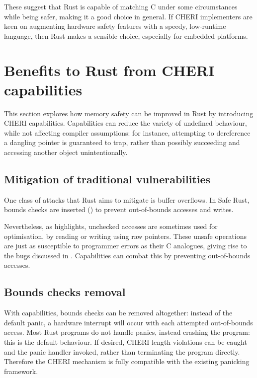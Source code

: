 \documentclass[dissertation.tex]{subfiles}
\begin{document}
These suggest that Rust is capable of matching C under some
circumstances while being safer, making it a good choice in general.
If CHERI implementers are keen on augmenting hardware safety features
with a speedy, low-runtime language, then Rust makes a sensible choice,
especially for embedded platforms.


\section{Benefits to Rust from CHERI capabilities}
\label{sec:eval-rust}

This section explores how memory safety can be improved in Rust by
introducing CHERI capabilities.
Capabilities can reduce the variety of undefined behaviour, while not
affecting compiler assumptions: for instance, attempting to dereference
a dangling pointer is guaranteed to trap, rather than possibly
succeeding and accessing another object unintentionally.

\subsection{Mitigation of traditional vulnerabilities}
\label{sec:eval-rust-vulns}

One class of attacks that Rust aims to mitigate is buffer overflows.
In Safe Rust, bounds checks are inserted ()
to prevent out-of-bounds accesses and writes.

Nevertheless, as  highlights, unchecked accesses
are sometimes used for optimisation, by reading or writing using raw
pointers.
These unsafe operations are just as susceptible to programmer errors as
their C analogues, giving rise to the bugs discussed in
.
Capabilities can combat this by preventing out-of-bounds accesses.


\subsection{Bounds checks removal}
\label{sec:eval-rust-bounds}

With capabilities, bounds checks can be removed altogether: instead of
the default panic, a hardware interrupt will occur with each attempted
out-of-bounds access.
Most Rust programs do not handle panics, instead crashing the program:
this is the default behaviour.
If desired, CHERI length violations can be caught and the panic handler
invoked, rather than terminating the program directly.
Therefore the CHERI mechanism is fully compatible with the existing
panicking framework.
\end{document}
